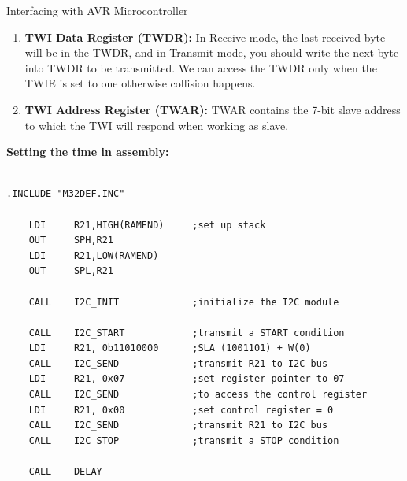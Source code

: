 \documentclass[11pt]{beamer}
\begin{document}
\begin{frame}{Interfacing with AVR Microcontroller}
\begin{enumerate}
\begin{enumerate}
                Making this bit HIGH will enable the generation of ACK when needed in slave or receiver mode.
                \item \textbf{Bit 7 -- TWINT (TWI Interrupt):}
                This bit is set by hardware when the TWI module has finished its current job. If the TWI and general
                interrupt are enabled, changing TWINT to one will cause the MCU to jump to the TWI interrupt vector.
                Clearing this flag starts the operation of the TWI. TWINT must be cleared by software.
            \end{enumerate}
            \item \textbf{TWI Data Register (TWDR):}
            In Receive mode, the last received byte will be in the TWDR, and in Transmit mode, you should write the next
            byte into TWDR to be transmitted. We can access the TWDR only when the TWIE is set to one otherwise
            collision happens.
            \item \textbf{TWI Address Register (TWAR):}
            TWAR contains the 7-bit slave address to which the TWI will respond
            when working as slave.
        \end{enumerate}

        \framebreak

        \textbf{\large Setting the time in assembly:}
        \\~\\

        \begin{verbatim}
.INCLUDE "M32DEF.INC"

    LDI     R21,HIGH(RAMEND)     ;set up stack
    OUT     SPH,R21
    LDI     R21,LOW(RAMEND)
    OUT     SPL,R21

    CALL    I2C_INIT             ;initialize the I2C module

    CALL    I2C_START            ;transmit a START condition
    LDI     R21, 0b11010000      ;SLA (1001101) + W(0)
    CALL    I2C_SEND             ;transmit R21 to I2C bus
    LDI     R21, 0x07            ;set register pointer to 07
    CALL    I2C_SEND             ;to access the control register
    LDI     R21, 0x00            ;set control register = 0
    CALL    I2C_SEND             ;transmit R21 to I2C bus
    CALL    I2C_STOP             ;transmit a STOP condition

    CALL    DELAY


\end{verbatim}
\end{frame}
\end{document}
